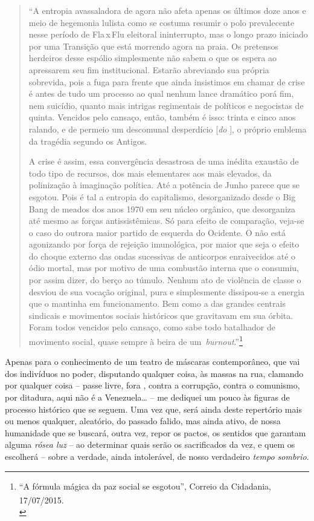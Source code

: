 \begin{quote}
``A entropia avassaladora de agora não afeta apenas os últimos doze anos
e meio de hegemonia lulista como se costuma resumir o polo prevalecente
nesse período de Fla\,x\,Flu eleitoral ininterrupto, mas o longo prazo
iniciado por uma Transição que está morrendo agora na praia. Os
pretensos herdeiros desse espólio simplesmente não sabem o que os espera
ao apressarem seu fim institucional. Estarão abreviando sua própria
sobrevida, pois a fuga para frente que ainda insistimos em chamar de
crise é antes de tudo um processo ao qual nenhum lance dramático porá
fim, nem suicídio, quanto mais intrigas regimentais de políticos e
negocistas de quinta. Vencidos pelo cansaço, então, também é isso:
trinta e cinco anos ralando, e de permeio um descomunal desperdício
{[}\emph{do }{]}, o próprio emblema da tragédia segundo os Antigos.

A crise é assim, essa convergência desastrosa de uma inédita exaustão de
todo tipo de recursos, dos mais elementares aos mais elevados, da
polinização à imaginação política. Até a potência de Junho parece que se
esgotou. Pois é tal a entropia do capitalismo, desorganizado desde o Big
Bang de meados dos anos 1970 em seu núcleo orgânico, que desorganiza até
mesmo as forças antissistêmicas. Só para efeito de comparação, veja-se o
caso do outrora maior partido de esquerda do Ocidente. O  não está
agonizando por força de rejeição imunológica, por maior que seja o
efeito do choque externo das ondas sucessivas de anticorpos enraivecidos
até o ódio mortal, mas por motivo de uma combustão interna que o
consumiu, por assim dizer, do berço ao túmulo. Nenhum ato de violência
de classe o desviou de sua vocação original, pura e simplesmente
dissipou-se a energia que o mantinha em funcionamento. Bem como a das
grandes centrais sindicais e movimentos sociais históricos que
gravitavam em sua órbita. Foram todos vencidos pelo cansaço, como sabe
todo batalhador de movimento social, quase sempre à beira de
um~\emph{burnout}.''\footnote{``A fórmula mágica da paz social se
  esgotou'', Correio da Cidadania, 17/07/2015.\textsuperscript{\\}}
\end{quote}

Apenas para o conhecimento de um teatro de máscaras contemporâneo, que
vai dos indivíduos no poder, disputando qualquer coisa, às massas na
rua, clamando por qualquer coisa -- passe livre, fora , contra a
corrupção, contra o comunismo, por ditadura, aqui não é a Venezuela…
-- me dediquei um pouco às figuras de processo histórico que se seguem.
Uma vez que, será ainda deste repertório mais ou menos qualquer,
aleatório, do passado falido, mas ainda ativo, de nossa humanidade que
se buscará, outra vez, repor os pactos, os sentidos que garantam alguma
\emph{rósea luz} -- ao determinar quais serão os sacrificados da vez, e
quem os escolherá -- sobre a verdade, ainda intolerável, de nosso
verdadeiro \emph{tempo sombrio}.

